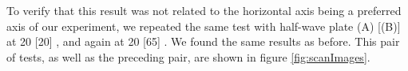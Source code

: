 \documentclass[letter]{article}
\begin{document}
To verify that this result was not related to the horizontal axis being a preferred axis of our experiment, we repeated the same test with half-wave plate (A) [(B)] at 20 [20] \unit{\deg}, and again at 20 [65] \unit{\deg}. We found the same results as before. This pair of tests, as well as the preceding pair, are shown in figure \ref{fig:scanImages}.
\end{document}
